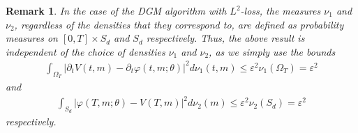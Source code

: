 \documentclass[11pt,reqno]{amsart}
\numberwithin{equation}{section}
\theoremstyle{plain}
\newtheorem{remark}[theorem]{Remark}
\begin{document}
\begin{remark}
\normalfont In the case of the DGM algorithm with $L^2$-loss, the measures $\nu_1$ and $\nu_2$, regardless of the densities that they correspond to, are defined as probability measures on $[0, T] \times S_d$ and $S_d$ respectively. Thus, the above result is \textit{independent} of the choice of densities $\nu_1$ and $\nu_2$, as we simply use the bounds
\begin{align*}
    \int_{\Omega_T} \left|\partial_t V(t,m) - \partial_t \varphi(t,m;\theta)\right|^2 d\nu_1(t,m) \leq \varepsilon^2 \nu_1(\Omega_T) = \varepsilon^2
\end{align*}
and
\begin{align*}
    \int_{S_d} |\varphi(T, m; \theta) - V(T, m)|^2 d\nu_2(m) \leq \varepsilon^2 \nu_2(S_d) = \varepsilon^2
\end{align*}
respectively.
\end{remark}
\end{document}
